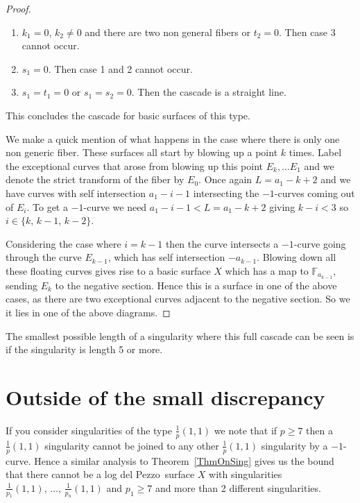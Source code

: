 \documentclass[12pt]{amsbook}
\theoremstyle{plain}
\newcommand{\ldp}{log del Pezzo}
\newcommand{\mb}[1]{\mathbb{#1}}
\begin{document}
\begin{proof}
\begin{enumerate}
\item $k_1 = 0$, $k_2 \neq 0$ and there are two non general fibers or $t_2 = 0$. Then case 3 cannot occur.

\item $s_1 = 0$. Then case 1 and 2 cannot occur. 

\item $s_1 = t_1 = 0$ or $s_1 = s_2 = 0$. Then the cascade is a straight line. 
\end{enumerate}
This concludes the cascade for basic surfaces of this type. 

We make a quick mention of what happens in the case where there is only one non generic fiber. These surfaces all start by blowing up a point $k$ times. Label the exceptional curves that arose from blowing up this point $E_{k}, \dots E_1$ and we denote the strict transform of the fiber by $E_{0}$. Once again $L = a_1 - k+ 2$ and we have curves with self intersection $a_1 - i -1$ intersecting the $-1$-curves coming out of $E_i$. To get a $-1$-curve we need $a_1 - i - 1 < L = a_1 - k+2$ giving $k-i < 3$ so $i \in \{ k, \, k-1,\, k-2 \}$. 

Considering the case where $i = k-1$ then the curve intersects a $-1$-curve going through the curve $E_{k-1}$, which has self intersection $-a_{k-1}$. Blowing down all these floating curves gives rise to a basic surface $X$ which has a map to $\mb{F}_{a_{k-1}}$, sending $E_k$ to the negative section. Hence this is a surface in one of the above cases, as there are two exceptional curves adjacent to the negative section. So we it lies in one of the above diagrams.
\end{proof}

The smallest possible length of a singularity where this full cascade can be seen is if the singularity is length 5 or more.

\section{Outside of the small discrepancy}

If you consider singularities of the type $\frac{1}{p}(1,1)$ we note that if $p \geq 7$ then a $\frac{1}{p}(1,1)$ singularity cannot be joined to any other $\frac{1}{p}(1,1)$ singularity by a $-1$-curve. Hence a similar analysis to  Theorem~\ref{ThmOnSing} gives us the bound that there cannot be a \ldp\ surface $X$ with singularities $\frac{1}{p_1}(1,1), \, \dots, \, \frac{1}{p_n}(1,1)$ and $p_1 \geq 7$ and more than 2 different singularities.
\end{document}
